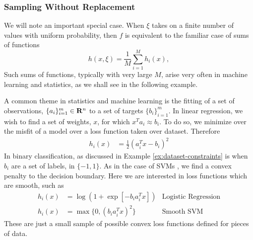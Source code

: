 \subsubsection{Sampling Without Replacement} We
will note an important special case. When $\xi$ takes on a finite number of
values with uniform probability, then $f$ is equivalent to the familiar case
of sums of functions
\begin{equation*} \label{eq:29}
h(x,\xi)=\frac{1}{M}\sum_{i=1}^{M}h_{i}(x),
\end{equation*}
Such sums of functions, typically with very large $M$, arise very often in
machine learning and statistics, as we shall see in the following example.


\begin{example} A common theme in statistics and
machine learning is the fitting of a set of observations,
$\{a_i\}_{i=1}^m \in \mathbf{R}^n$ to a set of targets $\{b_i\}_{i=1}^m$. In 
linear regression, we wish to find a set of weights, $x$, for which
$x^Ta_i \approx b_i$.  To do so, we minimize over the misfit of
a model over a loss function taken over dataset. Therefore 
\begin{align*}
h_{i}(x) & =\tfrac{1}{2}(a_{i}^{T}x-b_{i})^{2}
\end{align*}
In binary classification, as discussed in Example \ref{ex:dataset-constraints} is when
$b_i$ are a set of labels, in $\{-1,1\}$. As in the case of SVMs
, we find a convex penalty to the decision boundary. Here we are interested
in loss functions which are smooth, such as
\begin{align*}
h_{i}(x) & =\log(1+\exp[-b_{i}a_{i}^{T}x]) & \mbox{Logistic Regression}\\
h_{i}(x) & =\max\{0,(b_{i}a_{i}^{T}x)^{2}\} & \mbox{Smooth SVM}
\end{align*}
These are just a small sample of possible convex loss functions defined for
pieces of data.
\end{example}

